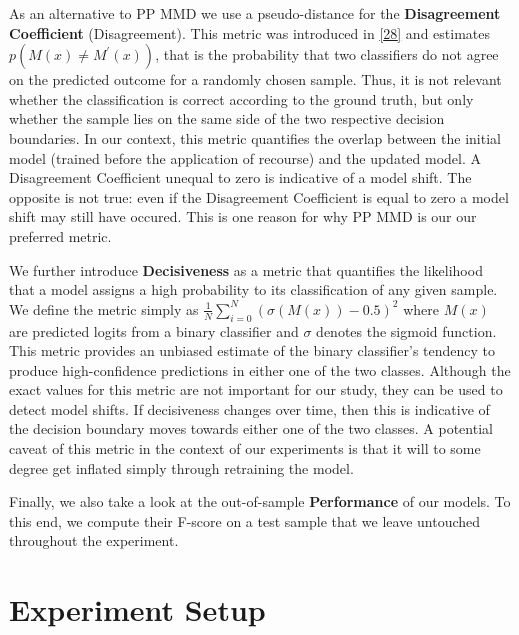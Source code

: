 \documentclass[conference,final,]{IEEEtran}
\begin{document}
As an alternative to PP MMD we use a pseudo-distance for the \textbf{Disagreement Coefficient} (Disagreement). This metric was introduced in \protect\hyperlink{ref-hanneke2007bound}{{[}28{]}} and estimates \(p(M(x) \neq M^\prime(x))\), that is the probability that two classifiers do not agree on the predicted outcome for a randomly chosen sample. Thus, it is not relevant whether the classification is correct according to the ground truth, but only whether the sample lies on the same side of the two respective decision boundaries. In our context, this metric quantifies the overlap between the initial model (trained before the application of recourse) and the updated model. A Disagreement Coefficient unequal to zero is indicative of a model shift. The opposite is not true: even if the Disagreement Coefficient is equal to zero a model shift may still have occured. This is one reason for why PP MMD is our our preferred metric.

We further introduce \textbf{Decisiveness} as a metric that quantifies the likelihood that a model assigns a high probability to its classification of any given sample. We define the metric simply as \({\frac{1}{N}}\sum_{i=0}^N(\sigma(M(x)) - 0.5)^2\) where \(M(x)\) are predicted logits from a binary classifier and \(\sigma\) denotes the sigmoid function. This metric provides an unbiased estimate of the binary classifier's tendency to produce high-confidence predictions in either one of the two classes. Although the exact values for this metric are not important for our study, they can be used to detect model shifts. If decisiveness changes over time, then this is indicative of the decision boundary moves towards either one of the two classes. A potential caveat of this metric in the context of our experiments is that it will to some degree get inflated simply through retraining the model.

Finally, we also take a look at the out-of-sample \textbf{Performance} of our models. To this end, we compute their F-score on a test sample that we leave untouched throughout the experiment.

\hypertarget{empirical}{%
\section{Experiment Setup}\label{empirical}}
\end{document}
